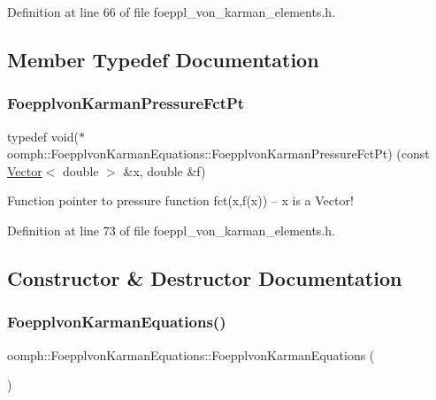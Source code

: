 Definition at line 66 of file foeppl\+\_\+von\+\_\+karman\+\_\+elements.\+h.



\subsection{Member Typedef Documentation}
\mbox{\label{classoomph_1_1FoepplvonKarmanEquations_a39b64f9712ec34f455beb9f4271ff297}} 
\subsubsection{\texorpdfstring{Foepplvon\+Karman\+Pressure\+Fct\+Pt}{FoepplvonKarmanPressureFctPt}}
{\footnotesize\ttfamily typedef void($\ast$ oomph\+::\+Foepplvon\+Karman\+Equations\+::\+Foepplvon\+Karman\+Pressure\+Fct\+Pt) (const \hyperlink{classoomph_1_1Vector}{Vector}$<$ double $>$ \&x, double \&f)}



Function pointer to pressure function fct(x,f(x)) -- x is a Vector! 



Definition at line 73 of file foeppl\+\_\+von\+\_\+karman\+\_\+elements.\+h.



\subsection{Constructor \& Destructor Documentation}
\mbox{\label{classoomph_1_1FoepplvonKarmanEquations_a53600b6656096c5674bfb3866ab2e29e}} 
\subsubsection{\texorpdfstring{Foepplvon\+Karman\+Equations()}{FoepplvonKarmanEquations()}\hspace{0.1cm}{\footnotesize\ttfamily [1/2]}}
{\footnotesize\ttfamily oomph\+::\+Foepplvon\+Karman\+Equations\+::\+Foepplvon\+Karman\+Equations (\begin{DoxyParamCaption}{ }\end{DoxyParamCaption})\hspace{0.3cm}{\ttfamily [inline]}}



